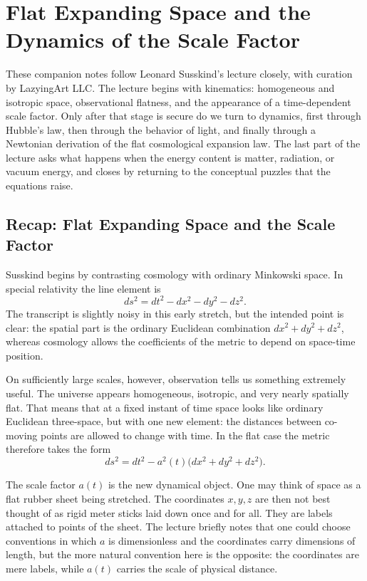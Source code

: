 \chapter{Flat Expanding Space and the Dynamics of the Scale Factor}

These companion notes follow Leonard Susskind's lecture closely, with curation by LazyingArt LLC. The lecture begins with kinematics: homogeneous and isotropic space, observational flatness, and the appearance of a time-dependent scale factor. Only after that stage is secure do we turn to dynamics, first through Hubble's law, then through the behavior of light, and finally through a Newtonian derivation of the flat cosmological expansion law. The last part of the lecture asks what happens when the energy content is matter, radiation, or vacuum energy, and closes by returning to the conceptual puzzles that the equations raise.

\section{Recap: Flat Expanding Space and the Scale Factor}

Susskind begins by contrasting cosmology with ordinary Minkowski space. In special relativity the line element is
\begin{equation}
ds^2 = dt^2 - dx^2 - dy^2 - dz^2.
\end{equation}
The transcript is slightly noisy in this early stretch, but the intended point is clear: the spatial part is the ordinary Euclidean combination \(dx^2+dy^2+dz^2\), whereas cosmology allows the coefficients of the metric to depend on space-time position.

On sufficiently large scales, however, observation tells us something extremely useful. The universe appears homogeneous, isotropic, and very nearly spatially flat. That means that at a fixed instant of time space looks like ordinary Euclidean three-space, but with one new element: the distances between co-moving points are allowed to change with time. In the flat case the metric therefore takes the form
\begin{equation}
ds^2 = dt^2 - a^2(t)\bigl(dx^2+dy^2+dz^2\bigr).
\end{equation}

The scale factor \(a(t)\) is the new dynamical object. One may think of space as a flat rubber sheet being stretched. The coordinates \(x,y,z\) are then not best thought of as rigid meter sticks laid down once and for all. They are labels attached to points of the sheet. The lecture briefly notes that one could choose conventions in which \(a\) is dimensionless and the coordinates carry dimensions of length, but the more natural convention here is the opposite: the coordinates are mere labels, while \(a(t)\) carries the scale of physical distance.

